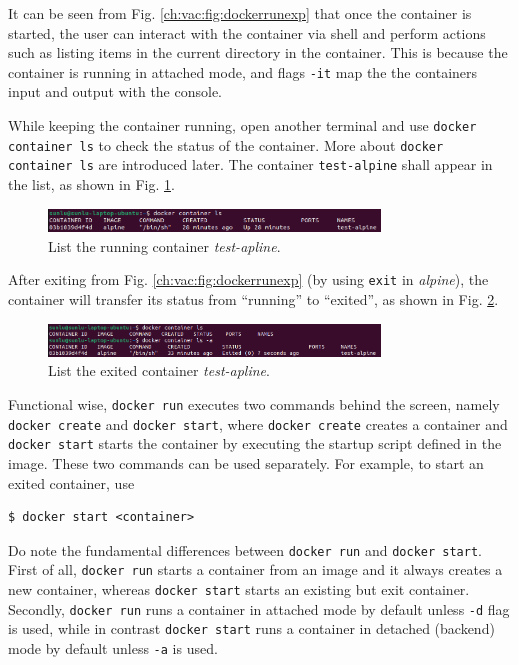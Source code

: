 It can be seen from Fig. \ref{ch:vac:fig:dockerrunexp} that once the container is started, the user can interact with the container via shell and perform actions such as listing items in the current directory in the container. This is because the container is running in attached mode, and flags \verb|-it| map the the containers input and output with the console.

While keeping the container running, open another terminal and use \verb|docker container ls| to check the status of the container. More about \verb|docker container ls| are introduced later. The container \verb|test-alpine| shall appear in the list, as shown in Fig. \ref{ch:vac:fig:dockerrunexppart2}.
\begin{figure}[!htb]
	\centering
	\includegraphics[width=250pt]{chapters/part-3/figures/dockerrunexppart2.png}
	\caption{List the running container \textit{test-apline}.} \label{ch:vac:fig:dockerrunexppart2}
\end{figure}
After exiting from Fig. \ref{ch:vac:fig:dockerrunexp} (by using \verb|exit| in \textit{alpine}), the container will transfer its status from ``running'' to ``exited'', as shown in Fig. \ref{ch:vac:fig:dockerrunexppart3}.
\begin{figure}[!htb]
	\centering
	\includegraphics[width=250pt]{chapters/part-3/figures/dockerrunexppart3.png}
	\caption{List the exited container \textit{test-apline}.} \label{ch:vac:fig:dockerrunexppart3}
\end{figure}

Functional wise, \verb|docker run| executes two commands behind the screen, namely \verb|docker create| and \verb|docker start|, where \verb|docker create| creates a container and \verb|docker start| starts the container by executing the startup script defined in the image. These two commands can be used separately. For example, to start an exited container, use
\begin{lstlisting}
$ docker start <container>
\end{lstlisting}

\begin{shortbox}

Do note the fundamental differences between \verb|docker run| and \verb|docker start|. First of all, \verb|docker run| starts a container from an image and it always creates a new container, whereas \verb|docker start| starts an existing but exit container. Secondly, \verb|docker run| runs a container in attached mode by default unless \verb|-d| flag is used, while in contrast \verb|docker start| runs a container in detached (backend) mode by default unless \verb|-a| is used. 
\end{shortbox}

